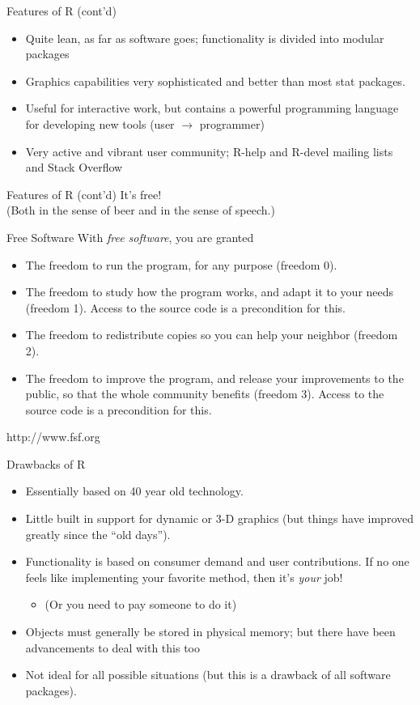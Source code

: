 \documentclass[aspectratio=169]{beamer}
\begin{document}
\begin{frame}{Features of R (cont'd)}
\begin{itemize}
\item
Quite lean, as far as software goes; functionality is divided into
modular packages
\item
Graphics capabilities very sophisticated and better than most stat
packages.
\item
Useful for interactive work, but contains a powerful programming
language for developing new tools (user $\longrightarrow$ programmer)
\item
Very active and vibrant user community; R-help and R-devel mailing
lists and Stack Overflow
\end{itemize}
\end{frame}

\begin{frame}{Features of R (cont'd)}
It's free!\\
(Both in the sense of beer and in the sense of speech.)
\end{frame}

\begin{frame}{Free Software}
With \textit{free software}, you are granted
\begin{itemize}
\item
The freedom to run the program, for any purpose (freedom 0).
\item
The freedom to study how the program works, and adapt it to your needs
(freedom 1). Access to the source code is a precondition for this.
\item
The freedom to redistribute copies so you can help your neighbor
(freedom 2).
\item
The freedom to improve the program, and release your improvements to
the public, so that the whole community benefits (freedom 3). Access
to the source code is a precondition for this.
\end{itemize}
http://www.fsf.org
\end{frame}

\begin{frame}{Drawbacks of R}
\begin{itemize}
\item
Essentially based on 40 year old technology.
\item
Little built in support for dynamic or 3-D graphics (but things have
improved greatly since the ``old days'').
\item
Functionality is based on consumer demand and user contributions.  If
no one feels like implementing your favorite method, then it's
\textit{your} job!
\begin{itemize}
\item (Or you need to pay someone to do it)
\end{itemize}
\item Objects must generally be stored in physical memory; but there
  have been advancements to deal with this too
\item
Not ideal for all possible situations (but this is a drawback of all
software packages).
\end{itemize}
\end{frame}
\end{document}
